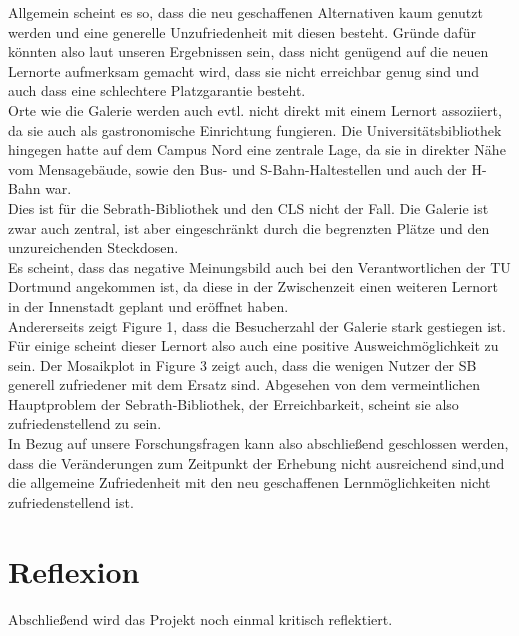 \documentclass[11pt, a4paper]{article}
\begin{document}
Allgemein scheint es so, dass die neu geschaffenen Alternativen kaum genutzt werden und eine generelle Unzufriedenheit mit diesen besteht. Gründe dafür könnten also laut unseren Ergebnissen sein, dass nicht genügend auf die neuen Lernorte aufmerksam gemacht wird, dass sie nicht erreichbar genug sind und auch dass eine schlechtere Platzgarantie besteht.\\

Orte wie die Galerie werden auch evtl. nicht direkt mit einem Lernort assoziiert, da sie auch als gastronomische Einrichtung fungieren. Die Universitätsbibliothek hingegen hatte auf dem Campus Nord eine zentrale Lage, da sie in direkter Nähe vom Mensagebäude, sowie den Bus- und S-Bahn-Haltestellen und auch der H-Bahn war.\\

Dies ist für die Sebrath-Bibliothek und den CLS nicht der Fall. Die Galerie ist zwar auch zentral, ist aber eingeschränkt durch die begrenzten Plätze und den unzureichenden Steckdosen.\\


Es scheint, dass das negative Meinungsbild auch bei den Verantwortlichen der TU Dortmund angekommen ist, da diese in der Zwischenzeit einen weiteren Lernort in der Innenstadt geplant und eröffnet haben.\\

Andererseits zeigt Figure 1, dass die Besucherzahl der Galerie stark gestiegen ist. 
Für einige scheint dieser Lernort also auch eine positive Ausweichmöglichkeit zu sein.
Der Mosaikplot in Figure 3 zeigt auch, dass die wenigen Nutzer der SB generell zufriedener mit dem Ersatz sind. Abgesehen von dem vermeintlichen Hauptproblem der Sebrath-Bibliothek, der Erreichbarkeit, scheint sie also zufriedenstellend zu sein.\\

In Bezug auf unsere Forschungsfragen kann also abschließend geschlossen werden, dass die Veränderungen zum Zeitpunkt der Erhebung nicht ausreichend sind,und die allgemeine Zufriedenheit mit den neu geschaffenen Lernmöglichkeiten nicht zufriedenstellend ist.



\newpage
\section{Reflexion}

Abschließend wird das Projekt noch einmal kritisch reflektiert. \\
\end{document}
